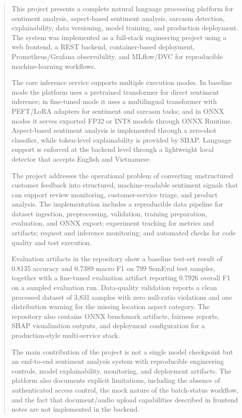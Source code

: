 \documentclass[12pt, a4paper]{article}
\begin{document}
\begin{abstract}
This project presents a complete natural language processing platform for sentiment analysis, aspect-based sentiment analysis, sarcasm detection, explainability, data versioning, model training, and production deployment. The system was implemented as a full-stack engineering project using a web frontend, a REST backend, container-based deployment, Prometheus/Grafana observability, and MLflow/DVC for reproducible machine-learning workflows.

The core inference service supports multiple execution modes. In baseline mode the platform uses a pretrained transformer for direct sentiment inference; in fine-tuned mode it uses a multilingual transformer with PEFT/LoRA adapters for sentiment and sarcasm tasks; and in ONNX modes it serves exported FP32 or INT8 models through ONNX Runtime. Aspect-based sentiment analysis is implemented through a zero-shot classifier, while token-level explainability is provided by SHAP. Language support is enforced at the backend level through a lightweight local detector that accepts English and Vietnamese.

The project addresses the operational problem of converting unstructured customer feedback into structured, machine-readable sentiment signals that can support review monitoring, customer-service triage, and product analysis. The implementation includes a reproducible data pipeline for dataset ingestion, preprocessing, validation, training preparation, evaluation, and ONNX export; experiment tracking for metrics and artifacts; request and inference monitoring; and automated checks for code quality and test execution.

Evaluation artifacts in the repository show a baseline test-set result of 0.8135 accuracy and 0.7389 macro F1 on 799 SemEval test samples, together with a fine-tuned evaluation artifact reporting 0.7926 overall F1 on a sampled evaluation run. Data-quality validation reports a clean processed dataset of 3,831 samples with zero null-ratio violations and one distribution warning for the missing location aspect category. The repository also contains ONNX benchmark artifacts, fairness reports, SHAP visualization outputs, and deployment configuration for a production-style multi-service stack.

The main contribution of the project is not a single model checkpoint but an end-to-end sentiment analysis system with reproducible engineering controls, model explainability, monitoring, and deployment artifacts. The platform also documents explicit limitations, including the absence of authenticated access control, the mock nature of the batch-status workflow, and the fact that document/audio upload capabilities described in frontend notes are not implemented in the backend.
\end{abstract}
\end{document}
